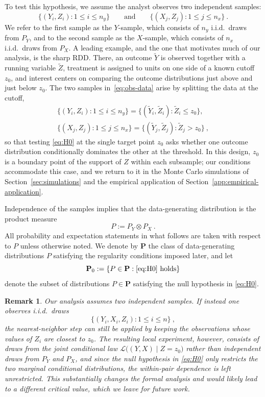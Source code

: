 \documentclass[11pt]{article}
\numberwithin{equation}{section}
\newtheorem{remark}{Remark}%
\begin{document}
To test this hypothesis, we assume the analyst observes two independent samples:
\begin{equation}\label{eq:obs-data}
\{(Y_i,Z_i):1\le i\le n_y\}
\qquad\text{and}\qquad
\{(X_j,Z_j):1\le j\le n_x\}~.
\end{equation}
We refer to the first sample as the $Y$-sample, which consists of $n_y$ i.i.d.\ draws from $P_Y$, and to the second sample as the $X$-sample, which consists of $n_x$ i.i.d.\ draws from $P_X$. A leading example, and the one that motivates much of our analysis, is the sharp RDD. There, an outcome $\tilde{Y}$ is observed together with a running variable $\tilde{Z}$, treatment is assigned to units on one side of a known cutoff $z_0$, and interest centers on comparing the outcome distributions just above and just below $z_0$. The two samples in~\eqref{eq:obs-data} arise by splitting the data at the cutoff,
\begin{gather*}
    \{(Y_i, Z_i): 1 \le i \le n_y\} = \{(\tilde{Y}_i, \tilde{Z}_i): \tilde{Z}_i \le z_0\}, \\
    \{(X_j, Z_j): 1 \le j \le n_x\} = \{(\tilde{Y}_j, \tilde{Z}_j): \tilde{Z}_j > z_0\}~,
\end{gather*}
so that testing \eqref{eq:H0} at the single target point $z_0$ asks whether one outcome distribution conditionally dominates the other at the threshold. In this design, $z_0$ is a boundary point of the support of $Z$ within each subsample; our conditions accommodate this case, and we return to it in the Monte Carlo simulations of Section~\ref{sec:simulations} and the empirical application of Section~\ref{app:empirical-application}.

Independence of the samples implies that the data-generating distribution is the product measure
\[
P := P_Y \otimes P_X~.
\]
All probability and expectation statements in what follows are taken with respect to $P$ unless otherwise noted. We denote by $\mathbf P$ the class of data-generating distributions $P$ satisfying the regularity conditions imposed later, and let 
\begin{equation}\label{eq:P_0}
  \mathbf P_{0} := \{P \in \mathbf P: \eqref{eq:H0}~ \text{holds}\}
\end{equation}
denote the subset of distributions $P\in \mathbf P$ satisfying the null hypothesis in \eqref{eq:H0}. 

\begin{remark}\label{rem:one-sample}
  Our analysis assumes two independent samples. If instead one observes i.i.d.\ draws
  \[
  \{(Y_i,X_i,Z_i):1\leq i\leq n\}~,
  \]
  the nearest-neighbor step can still be applied by keeping the observations whose values of $Z_i$ are closest to $z_0$. The resulting local experiment, however, consists of draws from the joint conditional law $\mathcal L\big((Y,X)\mid Z=z_0\big)$ rather than independent draws from $P_{Y}$ and $P_{X}$, and since the null hypothesis in \eqref{eq:H0} only restricts the two marginal conditional distributions, the within-pair dependence is left unrestricted. This substantially changes the formal analysis and would likely lead to a different critical value, which we leave for future work.
  \end{remark}
\end{document}
